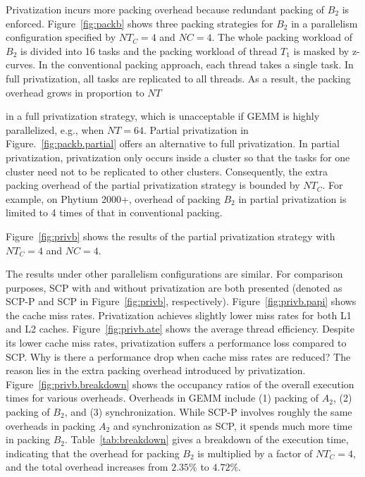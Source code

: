 Privatization incurs more packing overhead because
redundant packing of $B_2$ is enforced.
Figure~\ref{fig:packb} shows three packing strategies for $B_2$
in a parallelism configuration specified by
$NT_C=4$ and $NC=4$.
The whole packing workload of $B_2$ is divided into 16 tasks
and the packing workload of thread $T_1$ is masked by z-curves. 
In the conventional packing approach, each thread takes a single task.
In full privatization, all tasks are replicated to all threads.
As a result, the packing overhead grows in proportion to $NT$

in a full privatization strategy, which is unacceptable
if GEMM is highly parallelized, e.g., when $NT=64$.
Partial privatization in Figure.~\ref{fig:packb.partial}
offers an alternative to full privatization.
In partial privatization, privatization only occurs inside
a cluster so that the tasks for one cluster need not to be
replicated to other clusters.
Consequently,  the extra packing overhead of the partial privatization
strategy is bounded by $NT_C$.
For example, on Phytium 2000+, overhead of packing $B_2$
in partial privatization is limited to 4 times
of that in conventional packing.

Figure~\ref{fig:privb} shows the results of the partial
privatization strategy with $NT_C=4$ and $NC=4$.

The results under other parallelism configurations are similar.
For comparison purposes,
SCP with and without privatization are both presented
(denoted as SCP-P and SCP in Figure~\ref{fig:privb}, respectively).
Figure~\ref{fig:privb.papi} shows the cache miss rates.
Privatization achieves slightly lower miss rates for
both L1 and L2 caches.
Figure~\ref{fig:privb.ate} shows the average thread efficiency.
Despite its lower cache miss rates,
privatization suffers a performance loss compared to SCP.
Why is there a performance drop when cache miss rates 
are reduced?
The reason lies in the extra packing overhead introduced by privatization.
Figure~\ref{fig:privb.breakdown} shows the occupancy
ratios of the overall execution times for various overheads.
Overheads in GEMM include
(1) packing of $A_2$, (2) packing of $B_2$,
and (3) synchronization.
While SCP-P involves roughly the same overheads in
packing $A_2$ and synchronization as SCP,
it spends much more time in packing $B_2$.
Table~\ref{tab:breakdown} gives a breakdown of the
execution time, indicating that the overhead for packing $B_2$
is multiplied by a factor of $NT_C=4$,
and the total overhead increases from $2.35\%$ to $4.72\%$.

